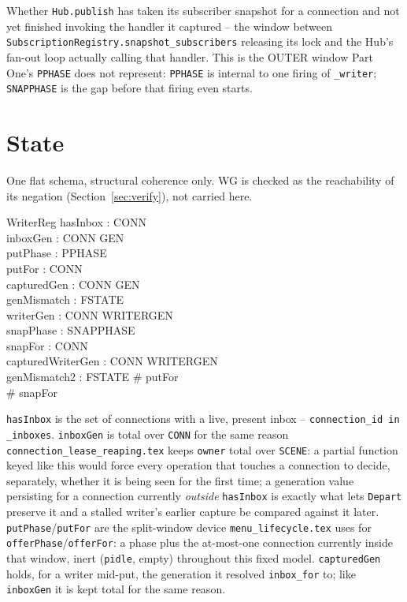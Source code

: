 \documentclass[a4paper,10pt,fleqn]{article}
\begin{document}
Whether \texttt{Hub.publish} has taken its subscriber snapshot for a
connection and not yet finished invoking the handler it captured -- the
window between \texttt{SubscriptionRegistry.snapshot\_subscribers} releasing
its lock and the Hub's fan-out loop actually calling that handler. This is
the OUTER window Part One's \texttt{PPHASE} does not represent: \texttt{PPHASE}
is internal to one firing of \texttt{\_writer}; \texttt{SNAPPHASE} is the
gap before that firing even starts.

\section{State}
\label{sec:state}

One flat schema, structural coherence only. WG is checked as the
reachability of its negation (Section~\ref{sec:verify}), not carried here.

\begin{schema}{WriterReg}
  hasInbox : \power CONN \\
  inboxGen : CONN \fun GEN \\
  putPhase : PPHASE \\
  putFor : \power CONN \\
  capturedGen : CONN \fun GEN \\
  genMismatch : FSTATE \\
  writerGen : CONN \fun WRITERGEN \\
  snapPhase : SNAPPHASE \\
  snapFor : \power CONN \\
  capturedWriterGen : CONN \fun WRITERGEN \\
  genMismatch2 : FSTATE
\where
  \# putFor  \\
  \# snapFor 
\end{schema}

\texttt{hasInbox} is the set of connections with a live, present inbox --
\texttt{connection\_id in \_inboxes}. \texttt{inboxGen} is total over
\texttt{CONN} for the same reason \texttt{connection\_lease\_reaping.tex}
keeps \texttt{owner} total over \texttt{SCENE}: a partial function keyed
like this would force every operation that touches a connection to decide,
separately, whether it is being seen for the first time; a generation value
persisting for a connection currently \emph{outside} \texttt{hasInbox} is
exactly what lets \texttt{Depart} preserve it and a stalled writer's earlier
capture be compared against it later. \texttt{putPhase}/\texttt{putFor} are
the split-window device \texttt{menu\_lifecycle.tex} uses for
\texttt{offerPhase}/\texttt{offerFor}: a phase plus the at-most-one
connection currently inside that window, inert (\texttt{pidle}, empty)
throughout this fixed model. \texttt{capturedGen} holds, for a writer
mid-put, the generation it resolved \texttt{inbox\_for} to; like
\texttt{inboxGen} it is kept total for the same reason.
\end{document}
